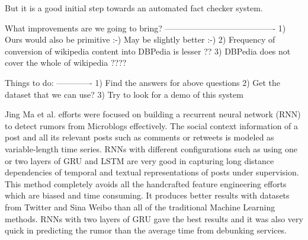 \documentclass[a4paper, 11pt]{article}
\begin{document}
But it is a good initial step towards an automated fact checker system.


What improvements are we going to bring?
----------------------------------------
1) Ours would also be primitive :-) May be slightly better :-)
2) Frequency of conversion of wikipedia content into DBPedia is lesser ??
3) DBPedia does not cover the whole of wikipedia ???? 

Things to do:
-------------
1) Find the answers for above questions
2) Get the dataset that we can use?
3) Try to look for a demo of this system

Jing Ma et al. efforts were focused on building a recurrent neural network (RNN) to detect rumors from Microblogs effectively. The social context information of a post and all its relevant posts such as comments or retweets is modeled as variable-length time series.  RNNs with different configurations such as using one or two layers of GRU and LSTM are very good in capturing long distance dependencies of temporal and textual representations of posts under supervision. This method completely avoids all the handcrafted feature engineering efforts which are biased and time consuming. It produces better results with datasets from Twitter and Sina Weibo than all of the traditional Machine Learning methods. RNNs with two layers of GRU gave the best results and it was also very quick in predicting the rumor than the average time from debunking services.  




\end{document}
